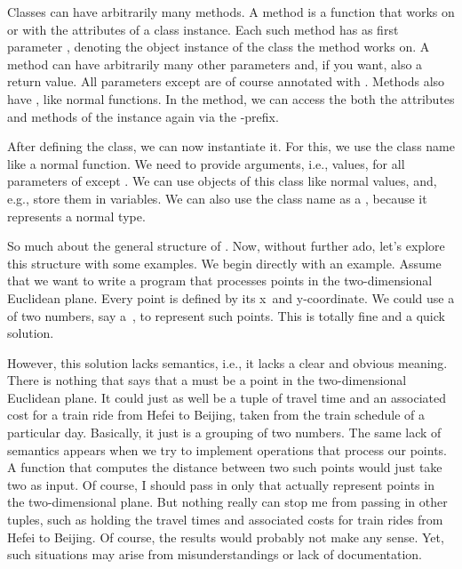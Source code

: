 Classes can have arbitrarily many methods.
A method is a function that works on or with the attributes of a class instance.
Each such method has as first parameter , denoting the object instance of the class the method works on.
A method can have arbitrarily many other parameters and, if you want, also a return value.
All parameters except  are of course annotated with .
Methods also have , like normal functions.
In the method, we can access the both the attributes and methods of the instance again via the -prefix.

After defining the class, we can now instantiate it.
For this, we use the class name like a normal function.
We need to provide arguments, i.e., values, for all parameters of  except .
We can use objects of this class like normal values, and, e.g., store them in variables.
We can also use the class name as a , because it represents a normal type.

So much about the general structure of .
Now, without further ado, let's explore this structure with some examples.%
%
%
\label{sec:immutableClassPoints2D}%
%
%
%
%
%
%
%
We begin directly with an example.
Assume that we want to write a program that processes points in the two-dimensional Euclidean plane.
Every point is defined by its x\nobreakdashes~and y\nobreakdashes-coordinate.
We could use a  of two numbers, say a~, to represent such points.
This is totally fine and a quick solution.

However, this solution lacks semantics, i.e., it lacks a clear and obvious meaning.
There is nothing that says that a  must be a point in the two-dimensional Euclidean plane.
It could just as well be a tuple of travel time and an associated cost for a train ride from Hefei to Beijing, taken from the train schedule of a particular day.
Basically, it just is a grouping of two numbers.
The same lack of semantics appears when we try to implement operations that process our points.
A function that computes the distance between two such points would just take two  as input.
Of course, I should pass in only  that actually represent points in the two-dimensional plane.
But nothing really can stop me from passing in other tuples, such as  holding the travel times and associated costs for train rides from Hefei to Beijing.
Of course, the results would probably not make any sense.
Yet, such situations may arise from misunderstandings or lack of documentation.

